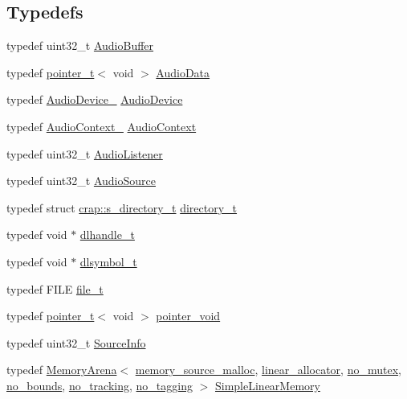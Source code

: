 \subsection*{Typedefs}
\begin{DoxyCompactItemize}
\item 
typedef uint32\+\_\+t \hyperlink{namespacecrap_a90f6b78604f0bc004080819aa4691107}{Audio\+Buffer}
\item 
typedef \hyperlink{structcrap_1_1pointer__t}{pointer\+\_\+t}$<$ void $>$ \hyperlink{namespacecrap_a0566c0c5049ce39b01856c01d2669f2c}{Audio\+Data}
\item 
typedef \hyperlink{audiodevice_8h_a13d8d739d6146ae8460383745ad22318}{Audio\+Device\+\_\+} \hyperlink{namespacecrap_a0554191481198902f832204ecc2db4c0}{Audio\+Device}
\item 
typedef \hyperlink{audiodevice_8h_a1aaee345eede00e723229ae1e895e0a7}{Audio\+Context\+\_\+} \hyperlink{namespacecrap_a4d9ca11977af369032d36460bc1c80e7}{Audio\+Context}
\item 
typedef uint32\+\_\+t \hyperlink{namespacecrap_a73b9ecbfa0198e8a702c3569958e1653}{Audio\+Listener}
\item 
typedef uint32\+\_\+t \hyperlink{namespacecrap_a462d678db37c6a434145136ab6d59720}{Audio\+Source}
\item 
typedef struct \hyperlink{structcrap_1_1s__directory__t}{crap\+::s\+\_\+directory\+\_\+t} \hyperlink{namespacecrap_a82911918170604f7fc9e93d66891069c}{directory\+\_\+t}
\item 
typedef void $\ast$ \hyperlink{namespacecrap_acee8e66495f007816233ce6b2da6465b}{dlhandle\+\_\+t}
\item 
typedef void $\ast$ \hyperlink{namespacecrap_a2eba1ed085b0da868a3cd8b2d6a4f7e7}{dlsymbol\+\_\+t}
\item 
typedef F\+I\+L\+E \hyperlink{namespacecrap_afd3eedf00a9de7958b7dd70aafff79a4}{file\+\_\+t}
\item 
typedef \hyperlink{structcrap_1_1pointer__t}{pointer\+\_\+t}$<$ void $>$ \hyperlink{namespacecrap_aa4cb82451ede6b73c49d862af29aebb3}{pointer\+\_\+void}
\item 
typedef uint32\+\_\+t \hyperlink{namespacecrap_acad6ca15596aab071175697e764086bb}{Source\+Info}
\item 
typedef \hyperlink{classcrap_1_1_memory_arena}{Memory\+Arena}$<$ \hyperlink{classcrap_1_1memory__source__malloc}{memory\+\_\+source\+\_\+malloc}, \hyperlink{classcrap_1_1linear__allocator}{linear\+\_\+allocator}, \hyperlink{structcrap_1_1no__mutex}{no\+\_\+mutex}, \hyperlink{structcrap_1_1no__bounds}{no\+\_\+bounds}, \hyperlink{structcrap_1_1no__tracking}{no\+\_\+tracking}, \hyperlink{structcrap_1_1no__tagging}{no\+\_\+tagging} $>$ \hyperlink{namespacecrap_a15a43bda87dfd4f909e30e1df3b1cee7}{Simple\+Linear\+Memory}

\end{DoxyCompactItemize}

